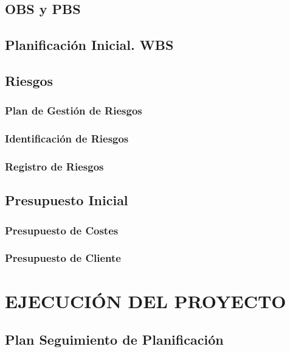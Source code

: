 \documentclass[11pt]{report}
\begin{document}
\subsection{OBS y PBS}


\subsection{Planificación Inicial. WBS}


\subsection{Riesgos}

\subsubsection{Plan de Gestión de Riesgos} 

\subsubsection{Identificación de Riesgos}

\subsubsection{Registro de Riesgos} 



\subsection{Presupuesto Inicial}

\subsubsection{Presupuesto de Costes}

\subsubsection{Presupuesto de Cliente} 


\newpage
\section{EJECUCIÓN DEL PROYECTO}

\subsection{Plan Seguimiento de Planificación}
\end{document}
